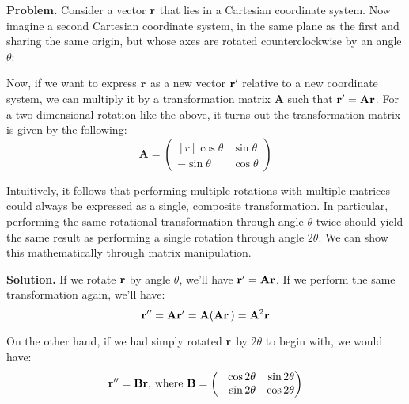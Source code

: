 \documentclass{article}
\begin{document}
\insertTitle

\textbf{Problem.} Consider a vector $\vb{r}$ that lies in a Cartesian coordinate system. Now imagine a second Cartesian coordinate system, in the same plane as the first and sharing the same origin, but whose axes are rotated counterclockwise by an angle $\theta$:

\begin{center}
\end{center}

Now, if we want to express $\vb{r}$ as a new vector $\vb{r'}$ relative to a new coordinate system, we can multiply it by a transformation matrix $\mathbf{A}$ such that $\vb{r'} = \mathbf{A}\vb{r}$. For a two-dimensional rotation like the above, it turns out the transformation matrix is given by the following:
\[
    \mathbf{A} =
    \begin{pmatrix*}[r]
    \cos\theta & \sin\theta \\
    -\sin\theta & \cos\theta
    \end{pmatrix*}
\]

Intuitively, it follows that performing multiple rotations with multiple matrices could always be expressed as a single, composite transformation. In particular, performing the same rotational transformation through angle $\theta$ twice should yield the same result as performing a single rotation through angle $2\theta$. We can show this mathematically through matrix manipulation.

\textbf{Solution.} If we rotate $\vb{r}$ by angle $\theta$, we'll have $\vb{r'} = \mathbf{A}\vb{r}$. If we perform the same transformation again, we'll have:
\[
    \vb{r''} = \mathbf{A}\vb{r'} = \mathbf{A}(\mathbf{A}\vb{r}\,) = \mathbf{A}^2 \vb{r}
\]

On the other hand, if we had simply rotated $\vb{r}$ by $2\theta$ to begin with, we would have:
\[
    \vb{r''} = \mathbf{B}\vb{r}\text{, where }\mathbf{B} =
    \begin{pmatrix*}[r]
    \cos2\theta & \sin2\theta \\
    -\sin2\theta & \cos2\theta
    \end{pmatrix*}
\]
\end{document}
